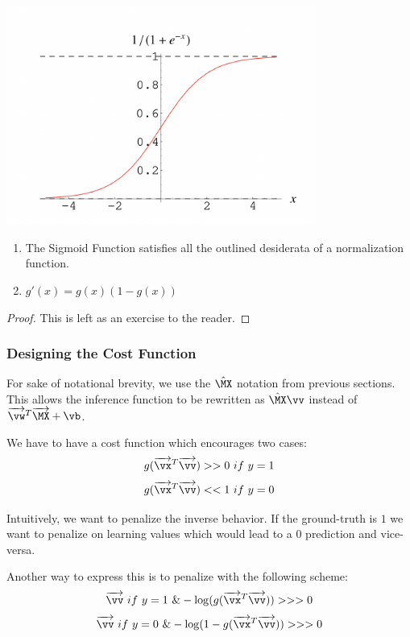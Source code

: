 \begin{enumerate}
    \begin{center}
    \includegraphics[width=4in]{images/Chapter6/sigmoid.png}
    \end{center}
    \begin{proposition}
    \begin{enumerate}
        \item The Sigmoid Function satisfies all the outlined desiderata of a normalization function.
        \item $g'(x) = g(x)(1 - g(x))$
    \end{enumerate}
    \end{proposition}
    
    \begin{proof}
    This is left as an exercise to the reader.
    \end{proof}
    
    \subsubsection{Designing the Cost Function}

    For sake of notational brevity, we use the $\hat{\MX}$ notation from previous sections. This allows the inference function to be rewritten as $\hat{\MX}\vv$ instead of $\overrightarrow{\vw}^T \overrightarrow{\MX} + \vb$.
    

    We have to have a cost function which encourages two cases: $$g(\overrightarrow{\vx}^T\overrightarrow{\vv}) >> 0 \  {if} \  y = 1$$
    $$g(\overrightarrow{\vx}^T\overrightarrow{\vv}) << 1 \  {if} \  y = 0$$
    
    Intuitively, we want to penalize the inverse behavior. If the ground-truth is $1$ we want to penalize on learning values which would lead to a $0$ prediction and vice-versa.
    
    Another way to express this is to penalize with the following scheme:
    $$\overrightarrow{\vv} \ {if} \  y = 1 \ \& -\log(g(\overrightarrow{\vx}^T\overrightarrow{\vv})) >>> 0$$
    $$\overrightarrow{\vv} \ {if} \  y = 0 \ \& -\log(1 - g(\overrightarrow{\vx}^T\overrightarrow{\vv})) >>> 0$$ 
    

\end{enumerate}
